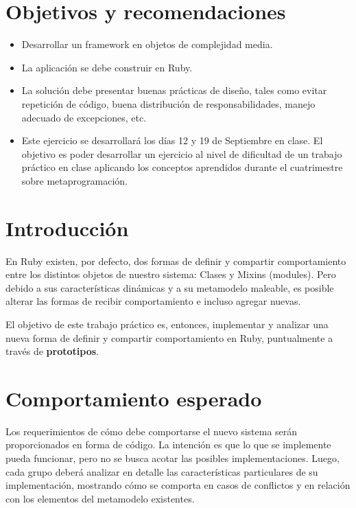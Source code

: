 \documentclass[spanish,a4paper]{article}
\begin{document}
\maketitle

\section{Objetivos y recomendaciones}

\begin{itemize}
  
  \item Desarrollar un framework en objetos de complejidad media.
  \item La aplicación se debe construir en Ruby.
  \item La solución debe presentar buenas prácticas de diseño, tales como
  evitar repetición de código, buena distribución de responsabilidades, manejo
  adecuado de excepciones, etc.
  \item Este ejercicio se desarrollará los días 12 y 19 de Septiembre en clase. 
  El objetivo es poder desarrollar un ejercicio al nivel de dificultad de un 
  trabajo práctico en clase aplicando los conceptos aprendidos durante el cuatrimestre sobre metaprogramación.

\end{itemize}
    
    
\section{Introducción}

En Ruby existen, por defecto, dos formas de definir y compartir comportamiento entre los distintos objetos de nuestro sistema: Clases y Mixins (modules). Pero debido a sus características dinámicas y a su metamodelo maleable, es posible alterar las formas de recibir comportamiento e incluso agregar nuevas.

El objetivo de este trabajo práctico es, entonces, implementar y analizar una nueva forma de definir y compartir comportamiento en Ruby, puntualmente a través de \textbf{prototipos}.


\section{Comportamiento esperado}
Los requerimientos de cómo debe comportarse el nuevo sistema serán proporcionados en forma de código. La intención es que lo que se implemente pueda funcionar, pero no se busca acotar las posibles implementaciones. Luego, cada grupo deberá analizar en detalle las características particulares de su implementación, mostrando cómo se comporta en casos de conflictos y en relación con los elementos del metamodelo existentes.
\end{document}
